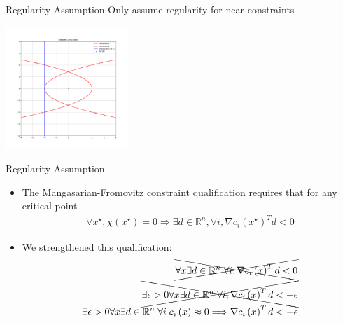 \documentclass{beamer}
\newcommand{\Rn}{\mathbb R ^ {n}}
\begin{document}
\begin{frame}{Regularity Assumption}
	Only assume regularity for near constraints
	\begin{center}
		\includegraphics[width=175px]{images/local_regularity.png}
	\end{center}
\end{frame}

\begin{frame}{Regularity Assumption}
\begin{itemize}
\item The Mangasarian-Fromovitz constraint qualification requires that for any critical point 
\begin{align*}
\forall x^{\star}, \chi\left(x^{\star}\right) = 0 
\Longrightarrow \exists d \in \Rn, \forall i, \nabla c_i\left(x^{\star}\right)^T d < 0 
\end{align*}
\item We strengthened this qualification:
\begin{align*}
\xcancel{\forall x \exists d \in \Rn\; \forall i, \nabla c_i\left(x\right)^T d < 0} \\
\xcancel{\exists \epsilon>0 \forall x \exists d \in \Rn\; \forall i, \nabla c_i\left(x\right)^T d < -\epsilon} \\
\exists \epsilon>0 \forall x\exists d\in \Rn\; \forall i\; c_i\left(x\right) \approx 0
\Longrightarrow \nabla c_i\left(x\right)^T d < -\epsilon \\
\end{align*}
\end{itemize}
\end{frame}
\end{document}
